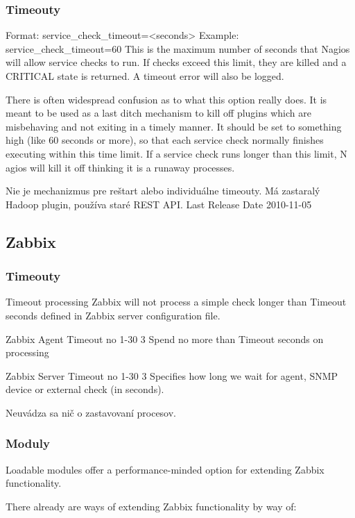\documentclass[11pt,final,oneside]{fithesis}
\begin{document}
\subsubsection{Timeouty}

Format:	service\_check\_timeout=<seconds>
Example:	service\_check\_timeout=60
This is the maximum number of seconds that Nagios will allow service checks to run. If checks exceed this limit, they are killed and a CRITICAL state is returned. A timeout error will also be logged.

There is often widespread confusion as to what this option really does. It is meant to be used as a last ditch mechanism to kill off plugins which are misbehaving and not exiting in a timely manner. 
It should be set to something high (like 60 seconds or more), so that each service check normally finishes executing within this time limit. If a service check runs longer than this limit, N
agios will kill it off thinking it is a runaway processes.

\cite{02}


Nie je mechanizmus pre reštart alebo individuálne timeouty.
Má zastaralý Hadoop plugin, používa staré REST API.
Last Release Date 2010-11-05
\cite{03}

\subsection{Zabbix}
\subsubsection{Timeouty}
Timeout processing
Zabbix will not process a simple check longer than Timeout seconds defined in Zabbix server configuration file.
\cite{04}

Zabbix Agent
Timeout	 no	 1-30	3	Spend no more than Timeout seconds on processing
\cite{20}

Zabbix Server
Timeout	 no	 1-30	3	Specifies how long we wait for agent, SNMP device or external check (in seconds).
\cite{05}

Neuvádza sa nič o zastavovaní procesov.
\subsubsection{Moduly}

Loadable modules offer a performance-minded option for extending Zabbix functionality.

There already are ways of extending Zabbix functionality by way of:
\end{document}
